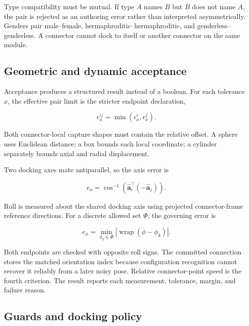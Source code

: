 Type compatibility must be mutual. If type $A$ names $B$ but $B$ does not name $A$,
the pair is rejected as an authoring error rather than interpreted asymmetrically.
Genders pair male--female, hermaphroditic--hermaphroditic, and
genderless--genderless. A connector cannot dock to itself or another connector on the
same module.

\subsection{Geometric and dynamic acceptance}

Acceptance produces a structured result instead of a boolean. For each tolerance $x$,
the effective pair limit is the stricter endpoint declaration,

\begin{equation}
\epsilon_x^{ij}=\min(\epsilon_x^i,\epsilon_x^j).
\label{eq:tolerance}
\end{equation}

Both connector-local capture shapes must contain the relative offset. A sphere uses
Euclidean distance; a box bounds each local coordinate; a cylinder separately bounds
axial and radial displacement.

Two docking axes mate antiparallel, so the axis error is

\begin{equation}
e_a=\cos^{-1}\!\left(\hat{\mathbf a}_i^\top(-\hat{\mathbf a}_j)\right).
\label{eq:axis-error}
\end{equation}

Roll is measured about the shared docking axis using projected connector-frame
reference directions. For a discrete allowed set $\Phi$, the governing error is

\begin{equation}
e_\phi=\min_{\phi_k\in\Phi}
\left|\operatorname{wrap}(\phi-\phi_k)\right|.
\label{eq:roll-error}
\end{equation}

Both endpoints are checked with opposite roll signs. The committed connection stores
the matched orientation index because configuration recognition cannot recover it
reliably from a later noisy pose. Relative connector-point speed is the fourth
criterion. The result reports each measurement, tolerance, margin, and failure reason.

\subsection{Guards and docking policy}

